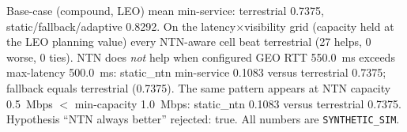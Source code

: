 Base-case (compound, LEO) mean min-service: terrestrial 0.7375, static/fallback/adaptive 0.8292. On the latency$\times$visibility grid (capacity held at the LEO planning value) every NTN-aware cell beat terrestrial (27 helps, 0 worse, 0 ties). NTN does \emph{not} help when configured GEO RTT 550.0~ms exceeds max-latency 500.0~ms: static\_ntn min-service 0.1083 versus terrestrial 0.7375; fallback equals terrestrial (0.7375). The same pattern appears at NTN capacity 0.5~Mbps $<$ min-capacity 1.0~Mbps: static\_ntn 0.1083 versus terrestrial 0.7375. Hypothesis ``NTN always better'' rejected: true. All numbers are \texttt{SYNTHETIC\_SIM}.
